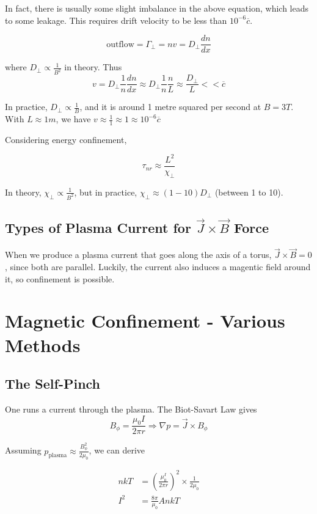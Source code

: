 \documentclass[12pt]{article}
\begin{document}
In fact, there is usually some slight imbalance in the above equation, which leads to some leakage. This requires drift velocity to be less than $10^{-6}\overline c$.

$$\text{outflow} = \Gamma_\perp = nv = D_\perp \frac{dn}{dx}$$

where $D_\perp \propto \frac{1}{B^2}$ in theory. Thus
$$v = D_\perp \frac{1}{n} \frac{dn}{dx} \approx D_\perp \frac{1}{n} \frac{n}{L} \approx \frac{D_\perp}{L} << \overline c$$

In practice, $D_\perp \propto \frac{1}{B}$, and it is around 1 metre squared per second at $B=3\unit{T}$. With $L \approx 1\unit{m}$, we have $v \approx \frac{1}{1} \approx 1 \approx 10^{-6} \overline c$

Considering energy confinement,

$$\tau_{nr} \approx \frac{L^2}{\chi_\perp}$$

In theory, $\chi_\perp \propto \frac{1}{B^2}$, but in practice, $\chi_\perp \approx (1-10)D_\perp$ (between 1 to 10).

\subsection{Types of Plasma Current for $\vec J \times \vec B$ Force}

When we produce a plasma current that goes along the axis of a torus, $\vec J \times \vec B = 0$, since both are parallel. Luckily, the current also induces a magentic field around it, so confinement is possible.

\section{Magnetic Confinement - Various Methods}

\subsection{The Self-Pinch}

One runs a current through the plasma. The Biot-Savart Law gives
$$B_\phi = \frac{\mu_0I}{2\pi r} \Rightarrow \nabla p = \vec J \times B_\phi$$

Assuming $p_{\text{plasma}} \approx \frac{B_\phi^2}{2\mu_0}$, we can derive

\begin{align*}
    nkT &= \left(\frac{\mu_0^I}{2\pi r}\right)^2 \times \frac{1}{2\mu_0} \\
    I^2 &= \frac{8\pi}{\mu_0}AnkT
\end{align*}
\end{document}
